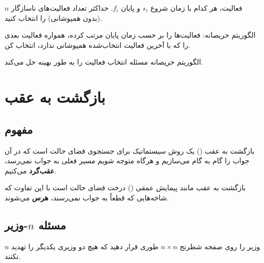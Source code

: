 \documentclass{matinbook}
\begin{document}
    \begin{definition}
        $n$ فعالیت، هر کدام با زمان شروع $s_{i}$
        و پایان $f_{i}$. حداکثر تعداد فعالیت‌های
        ناسازگار (بدون همپوشانی) را انتخاب کنید.
        \label{def:activity-selection}
    \end{definition}
    
    الگوریتم حریصانه: فعالیت‌ها را بر حسب
    زمان پایان مرتب کرده، همواره فعالیت بعدی
    را که با آخرین فعالیت انتخاب‌شده همپوشانی
    ندارد، انتخاب کن.
    
    \begin{theorem}
        الگوریتم حریصانه مسئله انتخاب فعالیت
        را به طور بهینه حل می‌کند.
        \label{thm:activity-optimal}
    \end{theorem}
    
    \section{بازگشت به عقب}
    
    \subsection{مفهوم}
    
    بازگشت به عقب
    () یک روش سیستماتیک
    برای جستجوی فضای حالت است که در آن
    جواب را گام به گام می‌سازیم و
    هرگاه متوجه شویم مسیر فعلی به جواب نمی‌رسد،
    \textbf{عقب‌گرد} می‌کنیم.
    
    \begin{definition}
        بازگشت به عقب مانند پیمایش عمقی ()
        درخت فضای حالت است با این تفاوت که
        شاخه‌هایی که قطعاً به جواب نمی‌رسند،
        \textbf{هرس} می‌شوند.
        \label{def:backtracking}
    \end{definition}
    
    \subsection{مسئله $n$-وزیر}
    
    \begin{definition}
        $n$ وزیر را روی صفحه شطرنج $n \times n$
        طوری قرار دهید که هیچ دو وزیری
        یکدیگر را تهدید نکنند.
        \label{def:n-queens}
    \end{definition}
    
\end{document}
